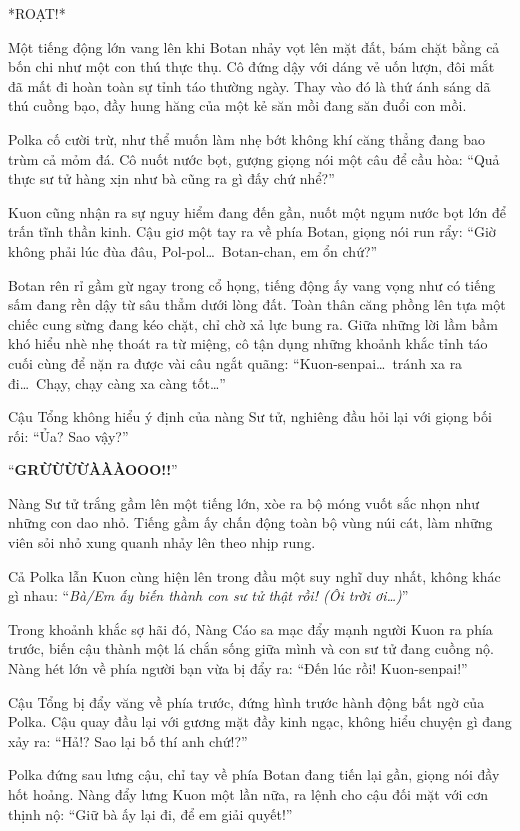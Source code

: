 \documentclass[../main.tex]{subfiles}
\begin{document}
*ROẠT!*

Một tiếng động lớn vang lên khi Botan nhảy vọt lên mặt đất, bám chặt bằng cả bốn chi như một con thú thực thụ. Cô đứng dậy với dáng vẻ uốn lượn, đôi mắt đã mất đi hoàn toàn sự tỉnh táo thường ngày. Thay vào đó là thứ ánh sáng dã thú cuồng bạo, đầy hung hăng của một kẻ săn mồi đang săn đuổi con mồi.

Polka cố cười trừ, như thể muốn làm nhẹ bớt không khí căng thẳng đang bao trùm cả mỏm đá. Cô nuốt nước bọt, gượng giọng nói một câu để cầu hòa: ``Quả thực sư tử hàng xịn như bà cũng ra gì đấy chứ nhể?''

Kuon cũng nhận ra sự nguy hiểm đang đến gần, nuốt một ngụm nước bọt lớn để trấn tĩnh thần kinh. Cậu giơ một tay ra về phía Botan, giọng nói run rẩy: ``Giờ không phải lúc đùa đâu, Pol-pol\dots\ Botan-chan, em ổn chứ?''

Botan rên rỉ gầm gừ ngay trong cổ họng, tiếng động ấy vang vọng như có tiếng sấm đang rền dậy từ sâu thẳm dưới lòng đất. Toàn thân căng phồng lên tựa một chiếc cung sừng đang kéo chặt, chỉ chờ xả lực bung ra. Giữa những lời lầm bầm khó hiểu nhè nhẹ thoát ra từ miệng, cô tận dụng những khoảnh khắc tỉnh táo cuối cùng để nặn ra được vài câu ngắt quãng: ``Kuon-senpai\dots\ tránh xa ra đi\dots\ Chạy, chạy càng xa càng tốt\dots''

Cậu Tổng không hiểu ý định của nàng Sư tử, nghiêng đầu hỏi lại với giọng bối rối: ``Ủa? Sao vậy?''

``{\Large\textbf{GRỪỪỪỪÀÀÀOOO!!}}''

Nàng Sư tử trắng gầm lên một tiếng lớn, xòe ra bộ móng vuốt sắc nhọn như những con dao nhỏ. Tiếng gầm ấy chấn động toàn bộ vùng núi cát, làm những viên sỏi nhỏ xung quanh nhảy lên theo nhịp rung.


Cả Polka lẫn Kuon cùng hiện lên trong đầu một suy nghĩ duy nhất, không khác gì nhau: ``\textit{Bà/Em ấy biến thành con sư tử thật rồi! (Ôi trời ơi\dots)}''

Trong khoảnh khắc sợ hãi đó, Nàng Cáo sa mạc đẩy mạnh người Kuon ra phía trước, biến cậu thành một lá chắn sống giữa mình và con sư tử đang cuồng nộ. Nàng hét lớn về phía người bạn vừa bị đẩy ra: ``Đến lúc rồi! Kuon-senpai!''

Cậu Tổng bị đẩy văng về phía trước, đứng hình trước hành động bất ngờ của Polka. Cậu quay đầu lại với gương mặt đầy kinh ngạc, không hiểu chuyện gì đang xảy ra: ``Hả!? Sao lại bố thí anh chứ!?''

Polka đứng sau lưng cậu, chỉ tay về phía Botan đang tiến lại gần, giọng nói đầy hốt hoảng. Nàng đẩy lưng Kuon một lần nữa, ra lệnh cho cậu đối mặt với cơn thịnh nộ: ``Giữ bà ấy lại đi, để em giải quyết!''
\end{document}
